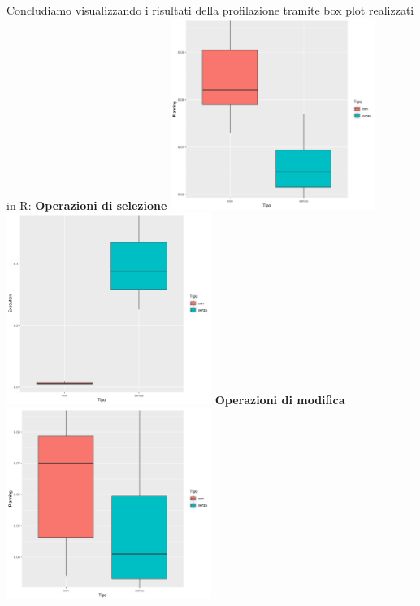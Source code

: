\documentclass{article}
\begin{document}
\newpage
\noindent
\newline
Concludiamo visualizzando i risultati della profilazione tramite box plot realizzati in R:
\newline
\newline
\textbf{Operazioni di selezione}
\newline
\newline
\includegraphics[width=0.5\textwidth]{planning_impiegato_dataAssunzione_selezione.png}
\includegraphics[width=0.5\textwidth]{execution_impiegato_dataAssunzione_selezione.png}
\newline
\newline
\textbf{Operazioni di modifica}
\newline
\newline
\includegraphics[width=0.5\textwidth]{planning_impiegato_dataAssunzione_modifica.png}
\end{document}
